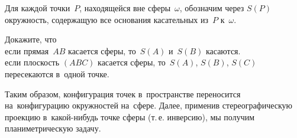 


\begingroup
    \def\spherex#1{S(#1)}

Для каждой точки~$P$, находящейся вне сферы~$\omega$, обозначим через
$\spherex{P}$ окружность, содержащую все основания касательных из~$P$
к~$\omega$.

\begin{problems}

\item
Докажите, что
\\
\subproblem
если прямая~$AB$ касается сферы, то~$\spherex{A}$ и~$\spherex{B}$ касаются.
\\
\subproblem
если плоскость $(ABC)$ касается сферы,
то~$\spherex{A}$, $\spherex{B}$, $\spherex{C}$ пересекаются в~одной точке.

\end{problems}

Таким образом, конфигурация точек в~пространстве переносится на~конфигурацию
окружностей на~сфере.
Далее, применив стереографическую проекцию в~какой-нибудь точке сферы
(т.\,е. инверсию), мы получим планиметрическую задачу.

